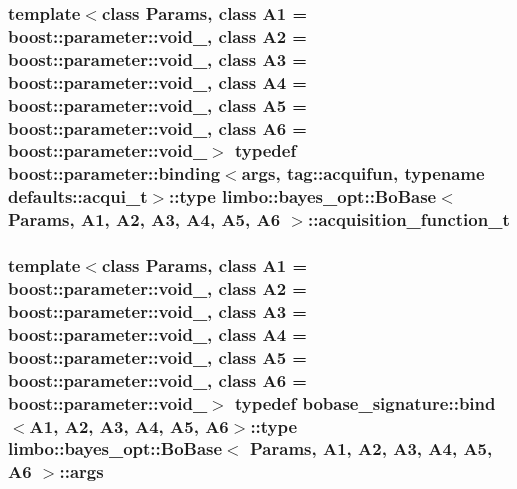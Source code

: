 \subsubsection[{acquisition\+\_\+function\+\_\+t}]{\setlength{\rightskip}{0pt plus 5cm}template$<$class Params, class A1 = boost\+::parameter\+::void\+\_\+, class A2 = boost\+::parameter\+::void\+\_\+, class A3 = boost\+::parameter\+::void\+\_\+, class A4 = boost\+::parameter\+::void\+\_\+, class A5 = boost\+::parameter\+::void\+\_\+, class A6 = boost\+::parameter\+::void\+\_\+$>$ typedef boost\+::parameter\+::binding$<${\bf args}, tag\+::acquifun, typename {\bf defaults\+::acqui\+\_\+t}$>$\+::type {\bf limbo\+::bayes\+\_\+opt\+::\+Bo\+Base}$<$ Params, A1, A2, A3, A4, A5, A6 $>$\+::{\bf acquisition\+\_\+function\+\_\+t}}\label{classlimbo_1_1bayes__opt_1_1_bo_base_a200a43abb6c95d2d99660898b36f2200}
\hypertarget{classlimbo_1_1bayes__opt_1_1_bo_base_a3844c259aa1e59d0241f90390aa6f7fa}{}
\subsubsection[{args}]{\setlength{\rightskip}{0pt plus 5cm}template$<$class Params, class A1 = boost\+::parameter\+::void\+\_\+, class A2 = boost\+::parameter\+::void\+\_\+, class A3 = boost\+::parameter\+::void\+\_\+, class A4 = boost\+::parameter\+::void\+\_\+, class A5 = boost\+::parameter\+::void\+\_\+, class A6 = boost\+::parameter\+::void\+\_\+$>$ typedef bobase\+\_\+signature\+::bind$<$A1, A2, A3, A4, A5, A6$>$\+::type {\bf limbo\+::bayes\+\_\+opt\+::\+Bo\+Base}$<$ Params, A1, A2, A3, A4, A5, A6 $>$\+::{\bf args}}\label{classlimbo_1_1bayes__opt_1_1_bo_base_a3844c259aa1e59d0241f90390aa6f7fa}
\hypertarget{classlimbo_1_1bayes__opt_1_1_bo_base_a734d263ce8c37ae2c5233f9e4499828c}{}
